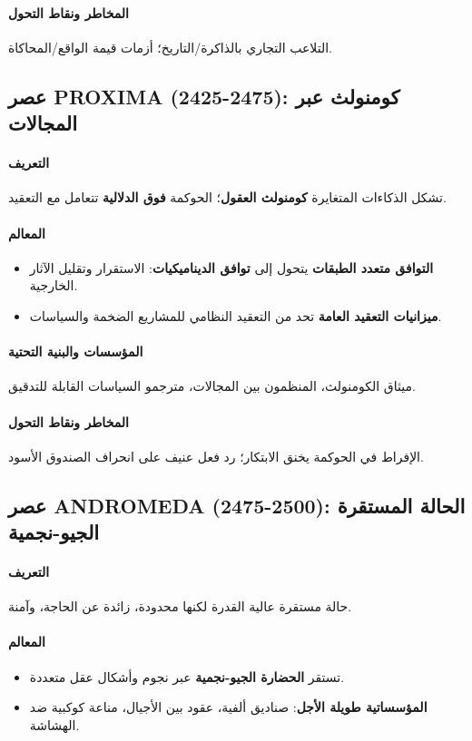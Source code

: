 \documentclass[11pt]{article}
\begin{document}
\paragraph{المخاطر ونقاط التحول} التلاعب التجاري بالذاكرة/التاريخ؛ أزمات قيمة الواقع/المحاكاة.

\subsection{عصر PROXIMA (2425-2475): كومنولث عبر المجالات}
\paragraph{التعريف} تشكل الذكاءات المتغايرة \textbf{كومنولث العقول}؛ الحوكمة \textbf{فوق الدلالية} تتعامل مع التعقيد.

\paragraph{المعالم}
\begin{itemize}[noitemsep]
  \item \textbf{التوافق متعدد الطبقات} يتحول إلى \textbf{توافق الديناميكيات}: الاستقرار وتقليل الآثار الخارجية.
  \item \textbf{ميزانيات التعقيد العامة} تحد من التعقيد النظامي للمشاريع الضخمة والسياسات.
\end{itemize}

\paragraph{المؤسسات والبنية التحتية} ميثاق الكومنولث، المنظمون بين المجالات، مترجمو السياسات القابلة للتدقيق.

\paragraph{المخاطر ونقاط التحول} الإفراط في الحوكمة يخنق الابتكار؛ رد فعل عنيف على انحراف الصندوق الأسود.

\subsection{عصر ANDROMEDA (2475-2500): الحالة المستقرة الجيو-نجمية}
\paragraph{التعريف} حالة مستقرة عالية القدرة لكنها محدودة، زائدة عن الحاجة، وآمنة.

\paragraph{المعالم}
\begin{itemize}[noitemsep]
  \item تستقر \textbf{الحضارة الجيو-نجمية} عبر نجوم وأشكال عقل متعددة.
  \item \textbf{المؤسساتية طويلة الأجل}: صناديق ألفية، عقود بين الأجيال، مناعة كوكبية ضد الهشاشة.
\end{itemize}
\end{document}
